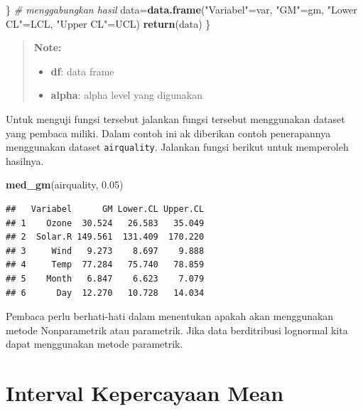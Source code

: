 \documentclass[]{book}
\newenvironment{Shaded}{\begin{snugshade}}{\end{snugshade}}
\newcommand{\KeywordTok}[1]{\textcolor[rgb]{0.13,0.29,0.53}{\textbf{#1}}}
\newcommand{\FloatTok}[1]{\textcolor[rgb]{0.00,0.00,0.81}{#1}}
\newcommand{\StringTok}[1]{\textcolor[rgb]{0.31,0.60,0.02}{#1}}
\newcommand{\CommentTok}[1]{\textcolor[rgb]{0.56,0.35,0.01}{\textit{#1}}}
\newcommand{\NormalTok}[1]{#1}
\providecommand{\tightlist}{%
  \setlength{\itemsep}{0pt}\setlength{\parskip}{0pt}}
\begin{document}
\begin{Shaded}
\begin{Highlighting}[]
\NormalTok{  \}}
  \CommentTok{# menggabungkan hasil}
\NormalTok{  data=}\KeywordTok{data.frame}\NormalTok{(}\StringTok{"Variabel"}\NormalTok{=var,}
                  \StringTok{"GM"}\NormalTok{=gm,}
                  \StringTok{"Lower CL"}\NormalTok{=LCL,}
                  \StringTok{"Upper CL"}\NormalTok{=UCL)}
  \KeywordTok{return}\NormalTok{(data)}
\NormalTok{\}}
\end{Highlighting}
\end{Shaded}

\begin{quote}
\textbf{Note: }

\begin{itemize}
\tightlist
\item
  \textbf{df}: data frame
\item
  \textbf{alpha}: alpha level yang digunakan
\end{itemize}
\end{quote}

Untuk menguji fungsi tersebut jalankan fungsi tersebut menggunakan
dataset yang pembaca miliki. Dalam contoh ini ak diberikan contoh
penerapannya menggunakan dataset \texttt{airquality}. Jalankan fungsi
berikut untuk memperoleh hasilnya.

\begin{Shaded}
\begin{Highlighting}[]
\KeywordTok{med_gm}\NormalTok{(airquality, }\FloatTok{0.05}\NormalTok{)}
\end{Highlighting}
\end{Shaded}

\begin{verbatim}
##   Variabel      GM Lower.CL Upper.CL
## 1    Ozone  30.524   26.583   35.049
## 2  Solar.R 149.561  131.409  170.220
## 3     Wind   9.273    8.697    9.888
## 4     Temp  77.284   75.740   78.859
## 5    Month   6.847    6.623    7.079
## 6      Day  12.270   10.728   14.034
\end{verbatim}

Pembaca perlu berhati-hati dalam menentukan apakah akan menggunakan
metode Nonparametrik atau parametrik. Jika data berditribusi lognormal
kita dapat menggunakan metode parametrik.

\section{Interval Kepercayaan Mean}\label{interval-kepercayaan-mean}
\end{document}
